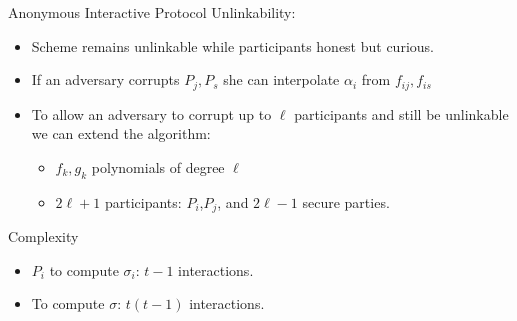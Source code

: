 \begin{frame}{Anonymous Interactive Protocol}
Unlinkability:
\begin{itemize}
\item Scheme remains unlinkable while participants honest but curious.
\item If an adversary corrupts $P_j, P_s$ she can interpolate $\alpha_i$ from $f_{ij},f_{is}$
\item To allow an adversary to corrupt up to $\ell$ participants and still be unlinkable we can extend the algorithm:
\begin{itemize}
\item $f_k,g_k$ polynomials of degree $\ell$
\item $2 \ell + 1$ participants: $P_i$,$P_j$, and $2\ell-1$ secure parties.
\end{itemize}
\end{itemize}
Complexity
\begin{itemize}
\item $P_i$ to compute $\sigma_i$: $t-1$ interactions.
\item To compute $\sigma$: $t(t-1)$ interactions.
\end{itemize}
\end{frame}